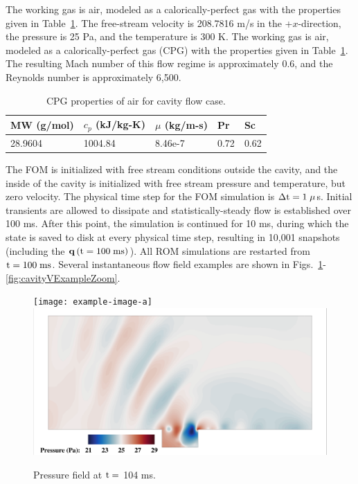 The working gas is air, modeled as a calorically-perfect gas with the properties given in Table~\ref{tab:airProps}. The free-stream velocity is 208.7816 m/s in the +$x$-direction, the pressure is 25 Pa, and the temperature is 300 K. The working gas is air, modeled as a calorically-perfect gas (CPG) with the properties given in Table~\ref{tab:airProps}. The resulting Mach number of this flow regime is approximately 0.6, and the Reynolds number is approximately 6,500.

\begin{table}
	\centering
	\begin{tabular}{ lllll }
	\toprule
	MW (g/mol) & $c_p$ (kJ/kg-K) & $\mu$ (kg/m-s) & Pr & Sc   \\
	\midrule
	28.9604 & 1004.84 & 8.46e-7 & 0.72 & 0.62 \\
	\bottomrule
	\end{tabular}
	\caption{\label{tab:airProps}CPG properties of air for cavity flow case.}
\end{table}

The FOM is initialized with free stream conditions outside the cavity, and the inside of the cavity is initialized with free stream pressure and temperature, but zero velocity. The physical time step for the FOM simulation is $\Delta \text{t} = 1 \;\mu$s. Initial transients are allowed to dissipate and statistically-steady flow is established over 100 ms. After this point, the simulation is continued for 10 ms, during which the state is saved to disk at every physical time step, resulting in 10,001 snapshots (including the $\mathbf{q}\left(\text{t} = 100 \; \text{ms}\right)$). All ROM simulations are restarted from $\text{t} = 100 \; \text{ms}$. Several instantaneous flow field examples are shown in Figs.~\ref{fig:cavityPressExample}-\ref{fig:cavityVExampleZoom}.

\begin{figure}
	\centering
	\ifdefined\DRAFT
		\texttt{[image: example-image-a]}
	\else
		\includegraphics[width=0.9\linewidth,trim={0.5em 0.5em 0.5em 0.5em},clip]{Chapters/CavityAndCVRC/Images/cavity/pressure_example_full.png}
	\fi
	\caption{\label{fig:cavityPressExample}Pressure field at $\text{t} =$ 104 ms.}
\end{figure}

